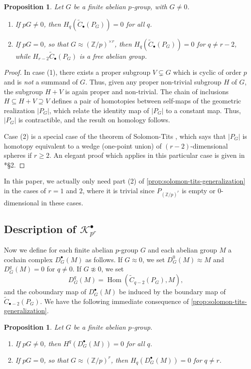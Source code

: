 \documentclass[11pt]{amsart}
\numberwithin{equation}{section}
\theoremstyle{plain}
\newtheorem{prop}[subsection]{Proposition}
\theoremstyle{remark}
\theoremstyle{plain}
\begin{document}
\begin{prop}\label{prop:solomon-tits-generalization}
Let $G$ be a finite abelian $p$-group, with $G\neq0$.
\begin{enumerate}
\item If $pG\neq 0$, then $H_q(\widetilde{C}_\bullet(P_G))=0$ for all $q$.
\item If $pG=0$, so that $G\approx ({\mathbb{Z}}/p)^{\times r}$, then
  $H_q(\widetilde{C}_\bullet(P_G))=0$ for $q\neq r-2$, while
  $H_{r-2}\widetilde{C}_\bullet (P_G)$ is a free
  abelian group.
\end{enumerate}
\end{prop}
\begin{proof}
In case (1), 
there exists a proper subgroup $V\subsetneq G$ which is cyclic of
order $p$
and is \emph{not} a summand of $G$.  Thus, given any proper
non-trivial subgroup $H$ of $G$, the subgroup $H+V$ is again proper
and non-trivial.  The chain of inclusions $H\subseteq H+V \supseteq V$ defines a
pair of homotopies between self-maps of the geometric realization
${\lvert{P_G}\rvert}$, which 
relate the identity map 
of ${\lvert{P_G}\rvert}$ to a constant map.  Thus, ${\lvert{P_G}\rvert}$ is contractible,
and the result on homology follows.

Case (2) is a special case of the theorem of Solomon-Tits
\cite{solomon-steinberg-character}, which says that ${\lvert{P_G}\rvert}$ is
homotopy equivalent to a wedge (one-point union) of
$(r-2)$-dimensional spheres if 
$r\geq2$.  An elegant proof which 
applies in this 
particular case is given in \cite{quillen-finite-generation}*{\S2}.
\end{proof}
In this paper, we actually only need part (2) of \eqref{prop:solomon-tits-generalization} in the cases
of $r=1$ and $2$, where it is trivial since $P_{({\mathbb{Z}}/p)^r}$ is
empty or $0$-dimensional  in these cases.

\subsection{Description of ${\mathscr{K}}^\bullet_{p^r}$}

Now we define for each finite abelian $p$-group $G$ and each abelian
group $M$ a cochain complex $D^\bullet_G(M)$ as follows.  If $G\approx
0$, we set $D^0_G(M)\approx M$ and $D^q_G(M)=0$ for $q\neq0$.  If
$G\not\approx 0$, we set
\[
D^q_G(M) = {{\operatorname{Hom}}}(\widetilde{C}_{q-2}(P_G), M),
\]
and the coboundary map of $D^\bullet_G(M)$ be induced by the boundary
map of $\widetilde{C}_{\bullet-2}(P_G)$.
We have the following immediate consequence of
\eqref{prop:solomon-tits-generalization}. 
\begin{prop}\label{prop:koszul-when-p-inverted}
Let $G$ be a finite abelian $p$-group.
\begin{enumerate}
\item If $pG\neq0$, then $H^q(D^\bullet_G(M))=0$ for all $q$.
\item If $pG=0$, so that $G\approx ({\mathbb{Z}}/p)^r$, then
  $H_q(D^\bullet_G(M))=0$ for $q\neq r$.
\end{enumerate}
\end{prop}
\end{document}
